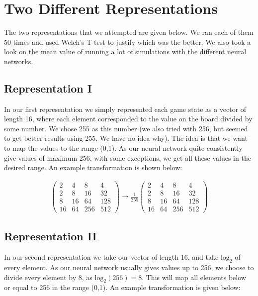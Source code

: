 \documentclass[11pt,a4paper]{article}
\begin{document}
\section*{Two Different Representations}
The two representations that we attempted are given below. We ran each of them 50 times and used Welch's T-test to justify which was the better. We also took a look on the mean value of running a lot of simulations with the different neural networks.

\subsection*{Representation I}
In our first representation we simply represented each game state as a vector of length 16, where each element corresponded to the value on the board divided by some number. We chose 255 as this number (we also tried with 256, but seemed to get better results using 255. We have no idea why). The idea is that we want to map the values to the range (0,1). As our neural network quite consistently give values of maximum 256, with some exceptions, we get all these values in the desired range. An example transformation is shown below:

\begin{align*}
\begin{pmatrix}
  2  &  4 &   8 &  4\\
  2  &  8 &  16 & 32 \\
  8  & 16 &  64 & 128 \\
  16 & 64 & 256 & 512
\end{pmatrix}
\rightarrow
\frac{1}{255}
\begin{pmatrix}
  2  &  4 &   8 &  4\\
  2  &  8 &  16 & 32 \\
  8  & 16 &  64 & 128 \\
  16 & 64 & 256 & 512
\end{pmatrix}
\end{align*}

\subsection*{Representation II}
In our second representation we take our vector of length 16, and take $\textrm{log}_2$ of every element. As our neural network usually gives values up to 256, we choose to divide every element by 8, as $\textrm{log}_2(256) = 8$. This will map all elements below or equal to 256 in the range (0,1). An example transformation is given below:
\end{document}
